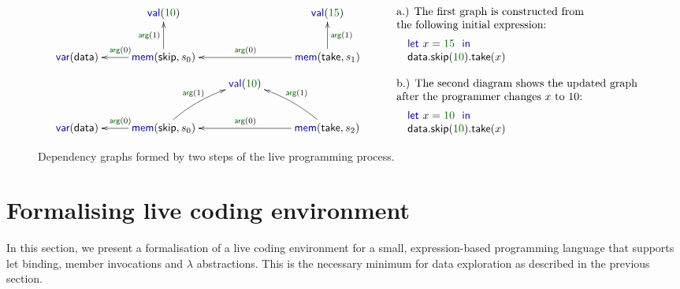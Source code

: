 \documentclass[sigplan,10pt]{acmart}\settopmatter{printfolios=true,printccs=false,printacmref=false}
\theoremstyle{plain}
\theoremstyle{definition}
\newcommand{\num}[1]{\textcolor{numclr}{#1}}
\newcommand{\ident}[1]{\textnormal{\sffamily #1}}
\newcommand{\kvd}[1]{\textnormal{\textcolor{kvdclr}{\sffamily #1}}}
\newcommand{\bnd}[1]{\textnormal{\textcolor{kvdclr}{\sffamily #1}}}
\newcommand{\blbl}[1]{\textnormal{\textcolor{numclr}{\sffamily #1}}}
\begin{document}
\begin{figure}
\begin{equation*}
\begin{array}{l}
\xymatrix{
& \bnd{val}(\num{10}) &\qquad\quad& \bnd{val}(\num{15})\\
\bnd{var}(\ident{data}) & 
  \bnd{mem}(\ident{skip},s_0)\ar[l]_{\blbl{arg}(0)} \ar[u]^{\blbl{arg}(1)} && 
  \bnd{mem}(\ident{take},s_1)\ar[ll]_{\blbl{arg}(0)} \ar[u]_{\blbl{arg}(1)}
}\\[5em]
\xymatrix{
&& \bnd{val}(\num{10})\\
\bnd{var}(\ident{data}) & 
  \bnd{mem}(\ident{skip}, s_0)\ar[l]_{\blbl{arg}(0)} \ar@/^/[ru]^{\blbl{arg}(1)} && 
  \bnd{mem}(\ident{take}, s_2)\ar[ll]_{\blbl{arg}(0)} \ar@/_/[lu]_{\blbl{arg}(1)}
}
\end{array}\qquad
\begin{array}{l}
\textnormal{a.) The first graph is constructed from}\\
\textnormal{the following initial expression:}\\[0.5em]
\quad\kvd{let}~x = \num{15}~\kvd{in}\\
\quad\ident{data.skip}(\num{10}).\ident{take}(x)\\
\\
\textnormal{b.) The second diagram shows the updated graph}\\
\textnormal{after the programmer changes $x$ to $10$:}\\[0.5em]
\quad\kvd{let}~x = \num{10}~\kvd{in}\\
\quad\ident{data.skip}(\num{10}).\ident{take}(x)
\end{array}
\end{equation*}
\caption{Dependency graphs formed by two steps of the live programming process. }
\label{fig:dep-graph}
\end{figure}


\newpage


\section{Formalising live coding environment}
\label{sec:formal}

In this section, we present a formalisation of a live coding environment for a small,
expression-based programming language that supports \kvd{let} binding, member invocations
and $\lambda$ abstractions. This is the necessary minimum for data exploration as described
in the previous section.  
\end{document}
